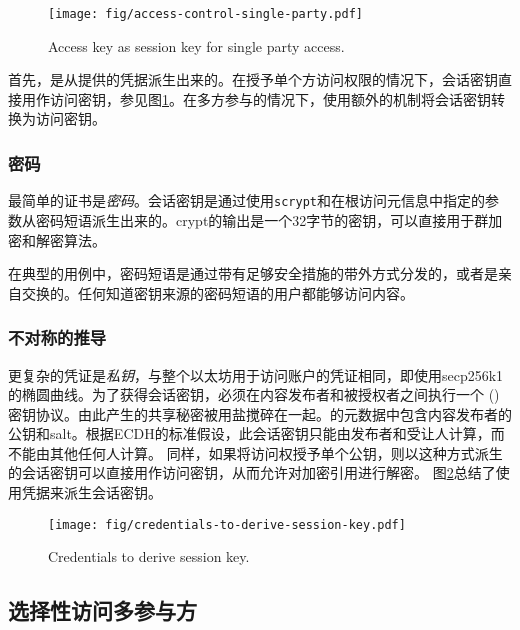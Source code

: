 \begin{figure}[htbp]
\centering
\texttt{[image: fig/access-control-single-party.pdf]}
\caption[Access key as session key for single party access  \statusyellow]{Access key as session key for single party access.}
\label{fig:access-control-single-party}
\end{figure}

首先，是从提供的凭据派生出来的。在授予单个方访问权限的情况下，会话密钥直接用作访问密钥，参见图\ref{fig:access-control-single-party}。在多方参与的情况下，使用额外的机制将会话密钥转换为访问密钥。

\subsubsection{密码}
最简单的证书是\emph{密码}。会话密钥是通过使用\lstinline{scrypt}和在根访问元信息中指定的参数从密码短语派生出来的。crypt的输出是一个32字节的密钥，可以直接用于群加密和解密算法。

在典型的用例中，密码短语是通过带有足够安全措施的带外方式分发的，或者是亲自交换的。任何知道密钥来源的密码短语的用户都能够访问内容。

\subsubsection{不对称的推导}

更复杂的凭证是\emph{私钥}，与整个以太坊用于访问账户的凭证相同，即使用secp256k1的椭圆曲线。为了获得会话密钥，必须在内容发布者和被授权者之间执行一个 ()密钥协议。由此产生的共享秘密被用盐搅碎在一起。的元数据中包含内容发布者的公钥和salt。根据ECDH的标准假设，此会话密钥只能由发布者和受让人计算，而不能由其他任何人计算。 
同样，如果将访问权授予单个公钥，则以这种方式派生的会话密钥可以直接用作访问密钥，从而允许对加密引用进行解密。 
图\ref{fig:credentials-to-derive-session-key}总结了使用凭据来派生会话密钥。

\begin{figure}[htbp]
\centering
\texttt{[image: fig/credentials-to-derive-session-key.pdf]}
\caption[Credentials to derive session key  \statusyellow]{Credentials to derive session key.}
\label{fig:credentials-to-derive-session-key}
\end{figure}


\subsection{选择性访问多参与方\statusgreen}

